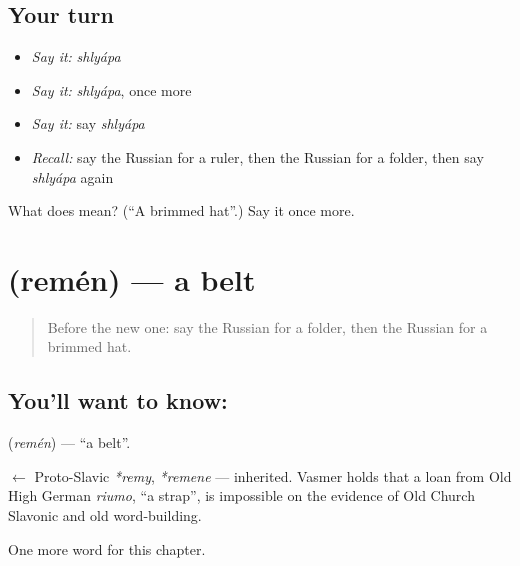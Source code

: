 \subsection*{Your turn}
\begin{itemize}
\raggedright
  \item \emph{Say it:} \emph{shlyápa}
  \item \emph{Say it:} \emph{shlyápa}, once more
  \item \emph{Say it:} say \emph{shlyápa}
  \item \emph{Recall:} say the Russian for a ruler, then the Russian for a folder, then say \emph{shlyápa} again
\end{itemize}

\begin{tcolorbox}[breakable,colback=teal!4,colframe=teal!35!black,title={Before you move on}]
What does  mean? (\textquotedblleft{}A brimmed hat\textquotedblright{}.) Say it once more.
\end{tcolorbox}
\section[\texorpdfstring{\ru{ремень} (remén)}{ремень (remén)}]{ (remén) — a belt}

\label{lesson:RU-C193-remen}



\begin{quote}
Before the new one: say the Russian for a folder, then the Russian for a brimmed hat.
\end{quote}

\subsection*{You'll want to know: }
\textbf{} (\emph{remén}) — \textquotedblleft{}a belt\textquotedblright{}.

\begin{cousinweb}
\textbf{} $\leftarrow$ Proto-Slavic \emph{*remy}, \emph{*remene} — inherited. Vasmer holds that a loan from Old High German \emph{riumo}, \textquotedblleft{}a strap\textquotedblright{}, is impossible on the evidence of Old Church Slavonic and old word-building.
\end{cousinweb}

\begin{grammarlens}[title={What you've built}]
One more word for this chapter.
\end{grammarlens}

